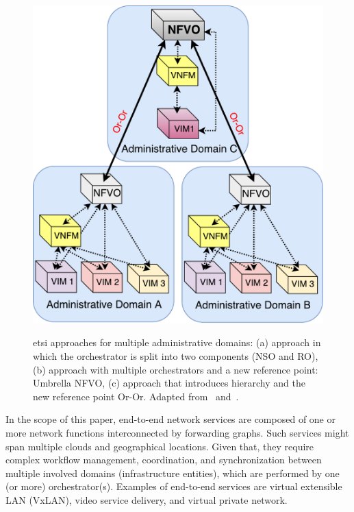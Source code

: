 \begin{figure}[t!]
{   \includegraphics[scale=.31]{Figures/04_NSO/mdo_etsi_3} 
   \label{fig:use3}
 }
 \caption{\gls{etsi} approaches for multiple administrative domains: (a) approach in which the orchestrator is split into two components (NSO and RO), (b) approach with multiple orchestrators and a new reference point: Umbrella NFVO, (c) approach that introduces hierarchy and the new reference point Or-Or. Adapted from~\cite{ETSIIndustrySpecificationGroupISGNFV2014NetworkOptions} and~\cite{ETSIGRDomains}.}
 \label{fig:k-clique}  
\end{figure}

In the scope of this paper, end-to-end network services are composed of one or more network functions interconnected by forwarding graphs. Such services might span multiple clouds and geographical locations. Given that, they require complex workflow management, coordination, and synchronization between multiple involved domains (infrastructure entities), which are performed by one (or more) orchestrator(s). Examples of end-to-end services are virtual extensible LAN (VxLAN), video service delivery, and virtual private network.


